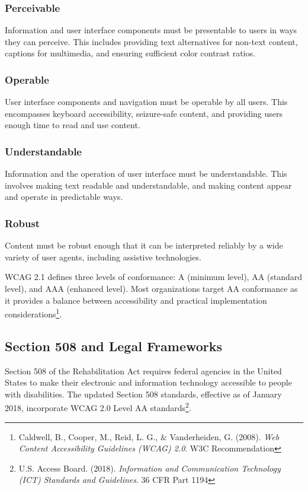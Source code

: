\subsubsection{Perceivable}
Information and user interface components must be presentable to users in ways they can perceive. This includes providing text alternatives for non-text content, captions for multimedia, and ensuring sufficient color contrast ratios.

\subsubsection{Operable}
User interface components and navigation must be operable by all users. This encompasses keyboard accessibility, seizure-safe content, and providing users enough time to read and use content.

\subsubsection{Understandable}
Information and the operation of user interface must be understandable. This involves making text readable and understandable, and making content appear and operate in predictable ways.

\subsubsection{Robust}
Content must be robust enough that it can be interpreted reliably by a wide variety of user agents, including assistive technologies.

WCAG 2.1 defines three levels of conformance: A (minimum level), AA (standard level), and AAA (enhanced level). Most organizations target AA conformance as it provides a balance between accessibility and practical implementation considerations\footnote{Caldwell, B., Cooper, M., Reid, L. G., \& Vanderheiden, G. (2008). \textit{Web Content Accessibility Guidelines (WCAG) 2.0}. W3C Recommendation}.

\subsection{Section 508 and Legal Frameworks}

Section 508 of the Rehabilitation Act requires federal agencies in the United States to make their electronic and information technology accessible to people with disabilities. The updated Section 508 standards, effective as of January 2018, incorporate WCAG 2.0 Level AA standards\footnote{U.S. Access Board. (2018). \textit{Information and Communication Technology (ICT) Standards and Guidelines}. 36 CFR Part 1194}.


